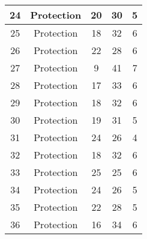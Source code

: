 \documentclass[results.tex]{subfiles}
\begin{document}
\begin{center}
\begin{tabular}{| c || c | c | c | c |}
            \hline
            24                      & Protection                   & 20                     & 30                      & 5                    \\
            \hline
            25                      & Protection                   & 18                     & 32                      & 6                    \\
            \hline
            26                      & Protection                   & 22                     & 28                      & 6                    \\
            \hline
            27                      & Protection                   & 9                      & 41                      & 7                    \\
            \hline
            28                      & Protection                   & 17                     & 33                      & 6                    \\
            \hline
            29                      & Protection                   & 18                     & 32                      & 6                    \\
            \hline
            30                      & Protection                   & 19                     & 31                      & 5                    \\
            \hline
            31                      & Protection                   & 24                     & 26                      & 4                    \\
            \hline
            32                      & Protection                   & 18                     & 32                      & 6                    \\
            \hline
            33                      & Protection                   & 25                     & 25                      & 6                    \\
            \hline
            34                      & Protection                   & 24                     & 26                      & 5                    \\
            \hline
            35                      & Protection                   & 22                     & 28                      & 5                    \\
            \hline
            36                      & Protection                   & 16                     & 34                      & 6                    \\

\end{tabular}
\end{center}
\end{document}
